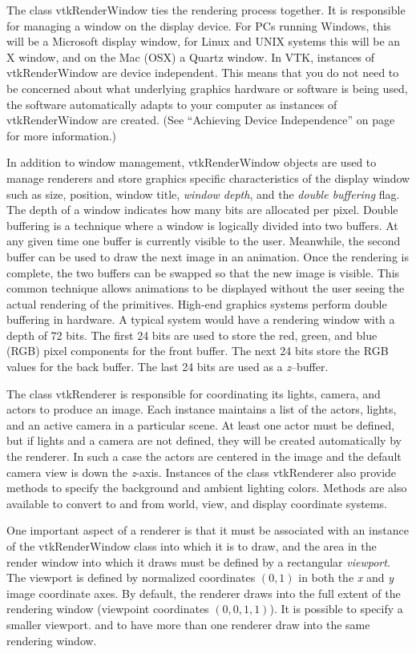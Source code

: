 The class vtkRenderWindow ties the rendering process together. It is responsible for managing a window on the display device. For PCs running Windows, this will be a Microsoft display window, for Linux and UNIX systems this will be an X window, and on the Mac (OSX) a Quartz window. In VTK, instances of vtkRenderWindow are device independent. This means that you do not need to be concerned about what underlying graphics hardware or software is being used, the software automatically adapts to your computer as instances of vtkRenderWindow are created. (See ``Achieving Device Independence'' on page \pageref{sec:adi} for more information.)

In addition to window management, vtkRenderWindow objects are used to manage renderers and store graphics specific characteristics of the display window such as size, position, window title, \emph{window depth}, and the \emph{double buffering} flag. The depth of a window indicates how many bits are allocated per pixel. Double buffering is a technique where a window is logically divided into two buffers. At any given time one buffer is currently visible to the user. Meanwhile, the second buffer can be used to draw the next image in an animation. Once the rendering is complete, the two buffers can be swapped so that the new image is visible. This common technique allows animations to be displayed without the user seeing the actual rendering of the primitives. High-end graphics systems perform double buffering in hardware. A typical system would have a rendering window with a depth of 72 bits. The first 24 bits are used to store the red, green, and blue (RGB) pixel components for the front buffer. The next 24 bits store the RGB values for the back buffer. The last 24 bits are used as a \emph{z}--buffer.

The class vtkRenderer is responsible for coordinating its lights, camera, and actors to produce an image. Each instance maintains a list of the actors, lights, and an active camera in a particular scene. At least one actor must be defined, but if lights and a camera are not defined, they will be created automatically by the renderer. In such a case the actors are centered in the image and the default camera view is down the \emph{z}-axis. Instances of the class vtkRenderer also provide methods to specify the background and ambient lighting colors. Methods are also available to convert to and from world, view, and display coordinate systems.

One important aspect of a renderer is that it must be associated with an instance of the vtkRenderWindow class into which it is to draw, and the area in the render window into which it draws must be defined by a rectangular \emph{viewport}. The viewport is defined by normalized coordinates $(0,1)$ in both the \emph{x} and \emph{y} image coordinate axes. By default, the renderer draws into the full extent of the rendering window (viewpoint coordinates $(0,0,1,1)$). It is possible to specify a smaller viewport. and to have more than one renderer draw into the same rendering window.

